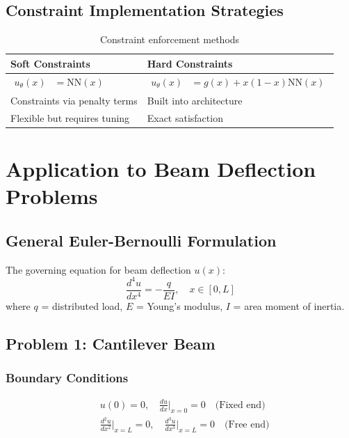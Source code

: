 \documentclass[12pt]{article}
\begin{document}
\subsection{Constraint Implementation Strategies}
\begin{table}[htbp]
    \centering
    \begin{tabular}{p{}p{}}
        \toprule
        \textbf{Soft Constraints} & \textbf{Hard Constraints} \\
        \midrule
        $\begin{aligned}
            u_{\theta}(x) &= \text{NN}(x)
        \end{aligned}$ & $\begin{aligned}
            u_{\theta}(x) &= g(x) + x(1-x)\text{NN}(x)
        \end{aligned}$ \\
        Constraints via penalty terms & Built into architecture \\
        Flexible but requires tuning & Exact satisfaction \\
        \bottomrule
    \end{tabular}
    \caption{Constraint enforcement methods}
    \label{tab:constraints}
\end{table}

\section{Application to Beam Deflection Problems}
\subsection{General Euler-Bernoulli Formulation}
The governing equation for beam deflection $u(x)$:
\begin{equation}
\frac{d^4 u}{dx^4} = -\frac{q}{EI}, \quad x \in [0,L]
\label{eq:beam_pde}
\end{equation}
where $q$ = distributed load, $E$ = Young's modulus, $I$ = area moment of inertia.

\subsection{Problem 1: Cantilever Beam}
\subsubsection{Boundary Conditions}
\begin{align}
&u(0) = 0, \quad \frac{du}{dx}\Big|_{x=0} = 0 \quad \text{(Fixed end)} \\
&\frac{d^2u}{dx^2}\Big|_{x=L} = 0, \quad \frac{d^3u}{dx^3}\Big|_{x=L} = 0 \quad \text{(Free end)}
\end{align}
\end{document}
